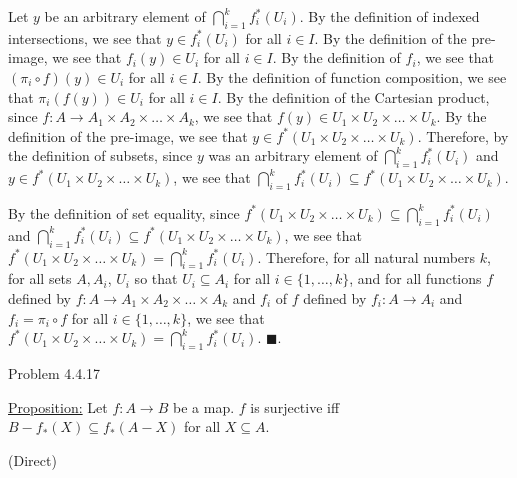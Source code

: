 \documentclass{article}
\theoremstyle{definition}
\renewcommand{\qed}{\blacksquare}
\newcommand{\img}{_{*}}
\newcommand{\pimg}{^{*}}
\begin{document}
	Let $y$ be an arbitrary element of $\bigcap_{i = 1}^k f_i \pimg (U_i)$.
	By the definition of indexed intersections, we see that $y \in f_i \pimg (U_i)$ for all $i \in I$.
	By the definition of the pre-image, we see that $f_i(y) \in U_i$ for all $i \in I$.
	By the definition of $f_i$, we see that $(\pi_i \circ f)(y) \in U_i$ for all $i \in I$.
	By the definition of function composition, we see that $\pi_i(f(y)) \in U_i$ for all $i \in I$.
	By the definition of the Cartesian product, since $f : A \rightarrow A_1 \times A_2 \times \dots \times A_k$, we see that $f(y) \in U_1 \times U_2 \times \dots \times U_k$.
	By the definition of the pre-image, we see that $y \in f \pimg (U_1 \times U_2 \times \dots \times U_k)$.
	Therefore, by the definition of subsets, since $y$ was an arbitrary element of $\bigcap_{i = 1}^k f_i \pimg (U_i)$ and $y \in f \pimg (U_1 \times U_2 \times \dots \times U_k)$, we see that $\bigcap_{i = 1}^k f_i \pimg (U_i) \subseteq f \pimg (U_1 \times U_2 \times \dots \times U_k)$.

	By the definition of set equality, since $f \pimg (U_1 \times U_2 \times \dots \times U_k) \subseteq \bigcap_{i = 1}^k f_i \pimg (U_i)$ and $\bigcap_{i = 1}^k f_i \pimg (U_i) \subseteq f \pimg (U_1 \times U_2 \times \dots \times U_k)$, we see that $f \pimg (U_1 \times U_2 \times \dots \times U_k) = \bigcap_{i = 1}^k f_i \pimg (U_i)$.
	Therefore, for all natural numbers $k$, for all sets $A, A_i$, $U_i$ so that $U_i \subseteq A_i$ for all $i \in \{1, \dots, k\}$, and for all functions $f$ defined by $f : A \rightarrow A_1 \times A_2 \times \dots \times A_k$ and $f_i$ of $f$ defined by $f_i : A \rightarrow A_i$ and $f_i = \pi_i \circ f$ for all $i \in \{1, \dots, k\}$, we see that $f \pimg (U_1 \times U_2 \times \dots \times U_k) = \bigcap_{i = 1}^k f_i \pimg (U_i)$.
	$\qed$.

	\vspace{0.5cm}


	\newpage

	\noindent Problem 4.4.17
	\vspace{0.2cm}

	\underline{Proposition:}
	Let $f : A \rightarrow B$ be a map.
	$f$ is surjective iff $B - f \img (X) \subseteq f \img (A - X)$ for all $X \subseteq A$.

	\vspace{0.2cm}
	 (Direct)
	\vspace{0.2cm}
\end{document}
